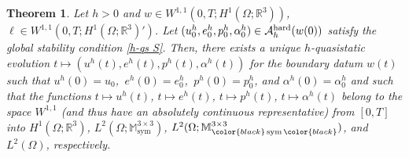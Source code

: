 \documentclass[reqno,10pt]{amsart}
\numberwithin{equation}{section}
\newtheorem{theorem}{Theorem}[section]
\theoremstyle{remark}
\newcommand{\RED}{\color{black}}
\newcommand{\BLACK}{\color{black}}
\newcommand{\PINK}{\color{black}}
\newcommand{\calA}{\mathcal{A}}
\newcommand{\M}{\mathbb{M}}
\newcommand{\R}{\mathbb{R}}
\DeclareMathOperator{\sym}{sym}
\begin{document}
\begin{theorem} \label{existence result of a quasistatic evolution}
Let $h > 0$ and $w \in W^{1,1} (0,T; H^1(\Omega;\R^3))$, $\ell \in W^{1,1}(0,T;H^1(\Omega;\R^3)')$.
Let $(u^h_0, e^h_0, p^h_0, \alpha^h_0) \in \calA_{h}^{\rm hard}(w(0))$ satisfy the global stability condition \ref{h-qs S}.
Then, there exists a unique $h$-quasistatic evolution $t \mapsto (u^h(t), e^h(t), p^h(t), \alpha^h(t))$ for the boundary datum $w(t)$ such that $u^h(0) = u_0$,\, $e^h(0) = e^h_0$,\, $p^h(0) = p^h_0$, and $\alpha^h(0) = \alpha^h_0$ and such that the functions $t \mapsto u^h(t)$, $t \mapsto e^h(t)$, $t \mapsto p^h(t)$, $t \mapsto \alpha^h(t)$ {\PINK belong to the space $W^{1,1}$ (and thus have an absolutely continuous representative)\BLACK} from $[0, T]$ into $H^1(\Omega;\R^3)$, $L^2(\Omega;\M^{3 \times 3}_{\sym})$, $L^2(\Omega;\M^{3 \times 3}_{{\RED\sym\BLACK}})$, and $L^2(\Omega)$, respectively.
\end{theorem}
\end{document}
